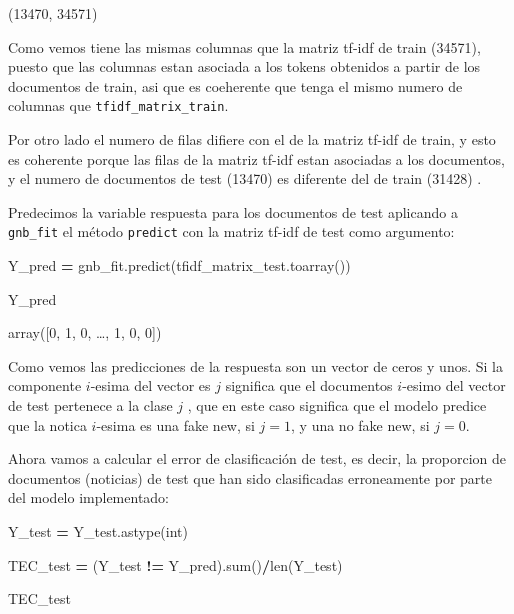 \documentclass[
  11pt,
  a4paper,
]{article}
\newenvironment{Shaded}{\begin{snugshade}}{\end{snugshade}}
\newcommand{\BuiltInTok}[1]{#1}
\newcommand{\NormalTok}[1]{#1}
\newcommand{\OperatorTok}[1]{\textcolor[rgb]{0.81,0.36,0.00}{\textbf{#1}}}
\newcommand{\StringTok}[1]{\textcolor[rgb]{0.31,0.60,0.02}{#1}}
\begin{document}
(13470, 34571)

Como vemos tiene las mismas columnas que la matriz tf-idf de train
(34571), puesto que las columnas estan asociada a los tokens obtenidos a
partir de los documentos de train, asi que es coeherente que tenga el
mismo numero de columnas que \texttt{tfidf\_matrix\_train}.

Por otro lado el numero de filas difiere con el de la matriz tf-idf de
train, y esto es coherente porque las filas de la matriz tf-idf estan
asociadas a los documentos, y el numero de documentos de test (13470) es
diferente del de train (31428) .

Predecimos la variable respuesta para los documentos de test aplicando a
\texttt{gnb\_fit} el método \texttt{predict} con la matriz tf-idf de
test como argumento:

\begin{Shaded}
\begin{Highlighting}[]
\NormalTok{Y\_pred }\OperatorTok{=}\NormalTok{ gnb\_fit.predict(tfidf\_matrix\_test.toarray())}

\NormalTok{Y\_pred}
\end{Highlighting}
\end{Shaded}

array({[}0, 1, 0, \ldots, 1, 0, 0{]})

Como vemos las predicciones de la respuesta son un vector de ceros y
unos. Si la componente \(i\)-esima del vector es \(j\) significa que el
documentos \(i\)-esimo del vector de test pertenece a la clase \(j\) ,
que en este caso significa que el modelo predice que la notica
\(i\)-esima es una fake new, si \(j=1\), y una no fake new, si \(j=0\).

Ahora vamos a calcular el error de clasificación de test, es decir, la
proporcion de documentos (noticias) de test que han sido clasificadas
erroneamente por parte del modelo implementado:

\begin{Shaded}
\begin{Highlighting}[]
\NormalTok{Y\_test }\OperatorTok{=}\NormalTok{ Y\_test.astype(}\StringTok{\textquotesingle{}int\textquotesingle{}}\NormalTok{)}

\NormalTok{TEC\_test }\OperatorTok{=}\NormalTok{ (Y\_test }\OperatorTok{!=}\NormalTok{ Y\_pred).}\BuiltInTok{sum}\NormalTok{()}\OperatorTok{/}\BuiltInTok{len}\NormalTok{(Y\_test)}

\NormalTok{TEC\_test}
\end{Highlighting}
\end{Shaded}
\end{document}
